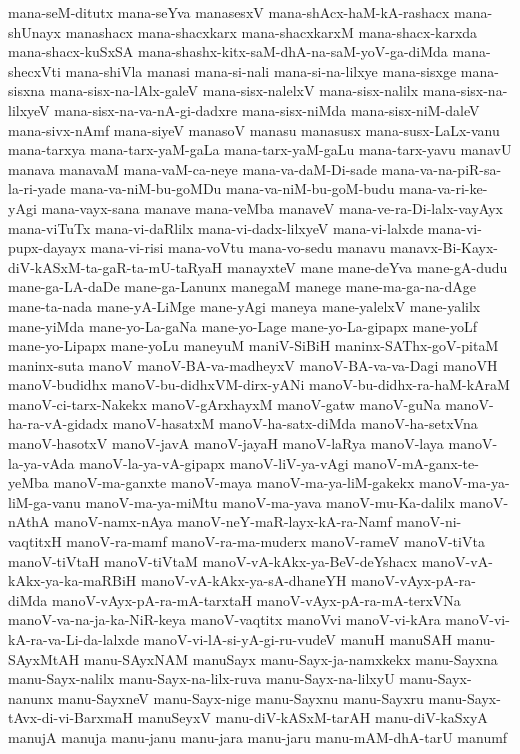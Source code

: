 {mana-seM-ditutx
mana-seYva
manasesxV
mana-shAcx-haM-kA-rashacx
mana-shUnayx
manashacx
mana-shacxkarx
mana-shacxkarxM
mana-shacx-karxda
mana-shacx-kuSxSA
mana-shashx-kitx-saM-dhA-na-saM-yoV-ga-diMda
mana-shecxVti
mana-shiVla
manasi
mana-si-nali
mana-si-na-lilxye
mana-sisxge
mana-sisxna
mana-sisx-na-lAlx-galeV
mana-sisx-nalelxV
mana-sisx-nalilx
mana-sisx-na-lilxyeV
mana-sisx-na-va-nA-gi-dadxre
mana-sisx-niMda
mana-sisx-niM-daleV
mana-sivx-nAmf
mana-siyeV
manasoV
manasu
manasusx
mana-susx-LaLx-vanu
mana-tarxya
mana-tarx-yaM-gaLa
mana-tarx-yaM-gaLu
mana-tarx-yavu
manavU
manava
manavaM
mana-vaM-ca-neye
mana-va-daM-Di-sade
mana-va-na-piR-sa-la-ri-yade
mana-va-niM-bu-goMDu
mana-va-niM-bu-goM-budu
mana-va-ri-ke-yAgi
mana-vayx-sana
manave
mana-veMba
manaveV
mana-ve-ra-Di-lalx-vayAyx
mana-viTuTx
mana-vi-daRlilx
mana-vi-dadx-lilxyeV
mana-vi-lalxde
mana-vi-pupx-dayayx
mana-vi-risi
mana-voVtu
mana-vo-sedu
manavu
manavx-Bi-Kayx-diV-kASxM-ta-gaR-ta-mU-taRyaH
manayxteV
mane
mane-deYva
mane-gA-dudu
mane-ga-LA-daDe
mane-ga-Lanunx
manegaM
manege
mane-ma-ga-na-dAge
mane-ta-nada
mane-yA-LiMge
mane-yAgi
maneya
mane-yalelxV
mane-yalilx
mane-yiMda
mane-yo-La-gaNa
mane-yo-Lage
mane-yo-La-gipapx
mane-yoLf
mane-yo-Lipapx
mane-yoLu
maneyuM
maniV-SiBiH
maninx-SAThx-goV-pitaM
maninx-suta
manoV
manoV-BA-va-madheyxV
manoV-BA-va-va-Dagi
manoVH
manoV-budidhx
manoV-bu-didhxVM-dirx-yANi
manoV-bu-didhx-ra-haM-kAraM
manoV-ci-tarx-Nakekx
manoV-gArxhayxM
manoV-gatw
manoV-guNa
manoV-ha-ra-vA-gidadx
manoV-hasatxM
manoV-ha-satx-diMda
manoV-ha-setxVna
manoV-hasotxV
manoV-javA
manoV-jayaH
manoV-laRya
manoV-laya
manoV-la-ya-vAda
manoV-la-ya-vA-gipapx
manoV-liV-ya-vAgi
manoV-mA-ganx-te-yeMba
manoV-ma-ganxte
manoV-maya
manoV-ma-ya-liM-gakekx
manoV-ma-ya-liM-ga-vanu
manoV-ma-ya-miMtu
manoV-ma-yava
manoV-mu-Ka-dalilx
manoV-nAthA
manoV-namx-nAya
manoV-neY-maR-layx-kA-ra-Namf
manoV-ni-vaqtitxH
manoV-ra-mamf
manoV-ra-ma-muderx
manoV-rameV
manoV-tiVta
manoV-tiVtaH
manoV-tiVtaM
manoV-vA-kAkx-ya-BeV-deYshacx
manoV-vA-kAkx-ya-ka-maRBiH
manoV-vA-kAkx-ya-sA-dhaneYH
manoV-vAyx-pA-ra-diMda
manoV-vAyx-pA-ra-mA-tarxtaH
manoV-vAyx-pA-ra-mA-terxVNa
manoV-va-na-ja-ka-NiR-keya
manoV-vaqtitx
manoVvi
manoV-vi-kAra
manoV-vi-kA-ra-va-Li-da-lalxde
manoV-vi-lA-si-yA-gi-ru-vudeV
manuH
manuSAH
manu-SAyxMtAH
manu-SAyxNAM
manuSayx
manu-Sayx-ja-namxkekx
manu-Sayxna
manu-Sayx-nalilx
manu-Sayx-na-lilx-ruva
manu-Sayx-na-lilxyU
manu-Sayx-nanunx
manu-SayxneV
manu-Sayx-nige
manu-Sayxnu
manu-Sayxru
manu-Sayx-tAvx-di-vi-BarxmaH
manuSeyxV
manu-diV-kASxM-tarAH
manu-diV-kaSxyA
manujA
manuja
manu-janu
manu-jara
manu-jaru
manu-mAM-dhA-tarU
manumf
}
